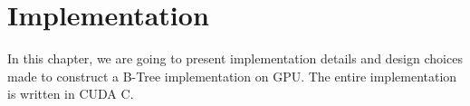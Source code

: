 \documentclass{article}
\newcommand{\CC}{C\nolinebreak[4]\hspace{-.05em}\raisebox{.4ex}{\relsize{-3}{\textbf{++}}}}
\theoremstyle{definition}
\theoremstyle{remark}
\theoremstyle{remark}
\begin{document}








% 

% 

\section{Implementation}

In this chapter, we are going to present implementation details and design choices made to construct a B-Tree implementation on GPU. The entire implementation is written in CUDA \CC.









\newpage



\newpage

\printbibliography
\end{document}
